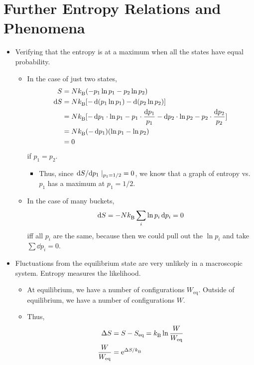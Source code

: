 \documentclass[../notes.tex]{subfiles}
\begin{document}
\section{Further Entropy Relations and Phenomena}
\begin{itemize}
    \item {}Verifying that the entropy is at a maximum when all the states have equal probability.
    \begin{itemize}
        \item In the case of just two states,
        \begin{align*}
            S &= N{k_\text{B}^{}}(-p_1\ln p_1-p_2\ln p_2)\\
            \dd{S} &= N{k_\text{B}^{}}[-\dd{(p_1\ln p_1)}-\dd{(p_2\ln p_2)}]\\
            &= N{k_\text{B}^{}}[-\dd{p_1}\cdot\ln p_1-p_1\cdot\frac{\dd{p_1}}{p_1}-\dd{p_2}\cdot\ln p_2-p_2\cdot\frac{\dd{p_2}}{p_2}]\\
            &= N{k_\text{B}^{}}(-\dd{p_1})(\ln p_1-\ln p_2)\\
            &= 0
        \end{align*}
        if $p_1=p_2$.
        \begin{itemize}
            \item Thus, since $\dv*{S}{p_1}|_{p_1=1/2}=0$, we know that a graph of entropy vs. $p_1$ has a maximum at $p_1=1/2$.
        \end{itemize}
        \item In the case of many buckets,
        \begin{equation*}
            \dd{S} = -N{k_\text{B}^{}}\sum_i\ln p_i\dd{p_i} = 0
        \end{equation*}
        iff all $p_i$ are the same, because then we could pull out the $\ln p_i$ and take $\sum\dd{p_i}=0$.
    \end{itemize}
    \item Fluctuations from the equilibrium state are very unlikely in a macroscopic system. Entropy measures the likelihood.
    \begin{itemize}
        \item At equilibrium, we have a number of configurations $W_\text{eq}$. Outside of equilibrium, we have a number of configurations $W$.
        \item Thus,
        \begin{align*}
            \Delta S &= S-S_\text{eq} = \kB\ln\frac{W}{W_\text{eq}}\\
            \frac{W}{W_\text{eq}} &= \e[\Delta S/\kB]

\end{align*}
\end{itemize}
\end{itemize}
\end{document}
